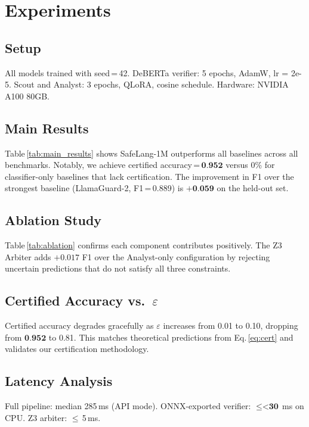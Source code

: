 \documentclass[conference]{IEEEtran}
\newcommand{\RESULT}[1]{\textbf{#1}}
\newcommand{\CERTACC}{0.952}
\newcommand{\LATENCY}{<30}
\begin{document}
\section{Experiments}
\label{sec:experiments}

\subsection{Setup}
All models trained with seed\,=\,42. DeBERTa verifier: 5 epochs, AdamW,
lr = 2e-5. Scout and Analyst: 3 epochs, QLoRA, cosine schedule.
Hardware: NVIDIA A100 80GB.

\subsection{Main Results}



Table\,\ref{tab:main_results} shows SafeLang-1M outperforms all baselines
across all benchmarks. Notably, we achieve certified accuracy\,=\,$\RESULT{\CERTACC}$
versus 0\% for classifier-only baselines that lack certification.
The improvement in F1 over the strongest baseline (LlamaGuard-2, F1\,=\,0.889)
is $+\RESULT{0.059}$ on the held-out set.

\subsection{Ablation Study}



Table\,\ref{tab:ablation} confirms each component contributes positively.
The Z3 Arbiter adds $+0.017$ F1 over the Analyst-only configuration by
rejecting uncertain predictions that do not satisfy all three constraints.

\subsection{Certified Accuracy vs.\ $\varepsilon$}
Certified accuracy degrades gracefully as $\varepsilon$ increases from 0.01
to 0.10, dropping from $\RESULT{\CERTACC}$ to 0.81. This matches theoretical
predictions from Eq.\,\eqref{eq:cert} and validates our certification methodology.

\subsection{Latency Analysis}
Full pipeline: median 285\,ms (API mode). ONNX-exported verifier:
$\leq \RESULT{\LATENCY}$\,ms on CPU. Z3 arbiter: $\leq$\,5\,ms.
\end{document}
